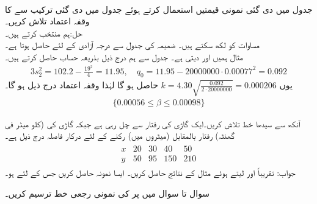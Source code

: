 \quad {}\\
جدول  میں دی گئی نمونی قیمتیں استعمال کرتے ہوئے جدول  میں دی گئی ترکیب سے  کا وقفہ اعتماد تلاش کریں۔\\
حل:\quad {}\quad ہم  منتخب کرتے ہیں۔\\
\quad مساوات  کو  لکھ سکتے ہیں۔ ضمیمہ  کی جدول  سے  درجہ آزادی کے لئے  حاصل ہوتا ہے۔\\
\quad مثال  ہمیں  اور   دیتی ہے۔ جدول  سے ہم درج ذیل بذریعہ حساب حاصل کرتے ہیں۔
\begin{align*}
3s_2^2=102.2-\frac{19^2}{4}=11.95, \quad q_0=11.95-\num{20000000}\cdot \num{0.00077}^2=0.092
\end{align*}
\quad یوں 
$k=4.30\sqrt{\frac{0.092}{2\cdot \num{20000000}}}=\num{0.000206}$
حاصل ہو گا لہٰذا وقفہ اعتماد درج ذیل ہو گا۔
\begin{align*}
\text{} \{\num{0.00056}\le \beta\le \num{0.00098}\}
\end{align*}

\quad
آنکھ سے سیدھا خط تلاش کریں۔ایک گاڑی  کی رفتار سے چل رہی ہے جبکہ گاڑی کی (کلو میٹر فی گھنٹہ) رفتار  بالمقابل (میٹروں میں) رکنے کے لئے درکار فاصلہ  درج ذیل ہے۔
\begin{align*}
\begin{array}{c|cccc}
x & 20&30&40&50\\
\hline
y&50&95&150&210
\end{array}
\end{align*}
جواب:\quad
تقریباً 
\quad
{} اور  لیتے ہوئے مثال  کے نتائج حاصل کریں۔
\quad
ایسا نمونہ حاصل کریں جس کے لئے  ہو۔

سوال  تا سوال   میں  پر  کی نمونی رجعی خط ترسیم کریں۔

